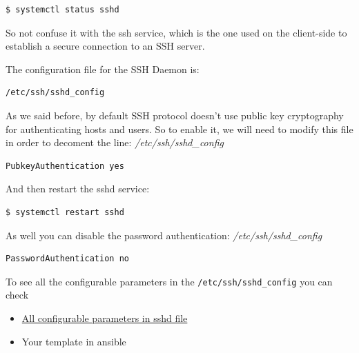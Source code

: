 \documentclass{article}
\newenvironment{blocktemplateII}[1]{%
    \tcolorbox[beamer,%
    noparskip,breakable,
    colframe=Green,%
    colbacklower=LimeGreen!75!LightGreen,%
    title=#1]}%
    {\endtcolorbox}
\newenvironment{blocktemplateIII}[1]{%
    \tcolorbox[beamer,%
    noparskip,breakable,
    ,colframe=Red,%
    colbacklower=LimeGreen!75!LightGreen,%
    title=#1]}%
    {\endtcolorbox}
\newenvironment{codetemplate}[1][]{%
  \mybasecolorbox[#1]
  \itshape
}{%
  \endmybasecolorbox
}
\begin{document}
\begin{codetemplate}{}
\begin{verbatim}
$ systemctl status sshd
\end{verbatim}
\end{codetemplate}

\begin{blocktemplateIII}{WARNING}
So not confuse it with the ssh service,  which is the one used on the client-side to establish a secure connection to an SSH server. 
\end{blocktemplateIII}

The configuration file for the SSH Daemon is:
\begin{codetemplate}{}
\begin{verbatim}
/etc/ssh/sshd_config
\end{verbatim}
\end{codetemplate}

As we said before, by default SSH protocol doesn't use public key cryptography for authenticating hosts and users. So to enable it, we will need to modify this file in order to decoment the line:
\begin{codetemplate}{/etc/ssh/sshd\_config}
\begin{verbatim}
PubkeyAuthentication yes
\end{verbatim}
\end{codetemplate}

And then restart the sshd service:
\begin{codetemplate}{}
\begin{verbatim}
$ systemctl restart sshd
\end{verbatim}
\end{codetemplate}

\begin{blocktemplateII}{NOTE}
As well you can disable the password authentication:
\begin{codetemplate}{/etc/ssh/sshd\_config}
\begin{verbatim}
PasswordAuthentication no
\end{verbatim}
\end{codetemplate}
\end{blocktemplateII}

To see all the configurable parameters in the \verb|/etc/ssh/sshd_config| you can check

\begin{itemize}
    \item \href{https://www.ssh.com/academy/ssh/sshd_config}{All configurable parameters in sshd file}
    \item Your template in ansible
\end{itemize}
\end{document}
